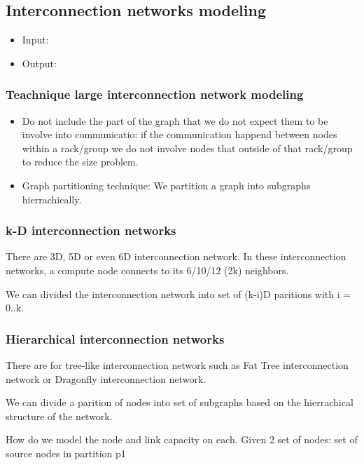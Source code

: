 \documentclass[letter]{article}
\begin{document}
\subsection {Interconnection networks  modeling}
\begin{itemize}
\item Input:
\item Output:
\end{itemize}

\subsubsection{Teachnique large interconnection network  modeling}
\begin{itemize}
\item Do not include the part of the graph that we do not expect them to be involve into communicatio: if the communication happend between nodes within a rack/group we do not involve nodes that outside of that rack/group to reduce the size problem.
\item Graph partitioning technique: We partition a graph into subgraphs hierrachically.
\end{itemize}

\subsubsection{k-D interconnection networks}
There are 3D, 5D or even 6D interconnection network. In these interconnection networks, a compute node connects to its 6/10/12 (2k) neighbors. %

We can divided the interconnection network into set of (k-i)D paritions with i = 0..k.

\subsubsection{Hierarchical interconnection networks}
There are for tree-like interconnection network such as Fat Tree interconnection network or Dragonfly interconnection network. 

We can divide a parition of nodes into set of subgraphs based on the hierrachical structure of the network.

How do we model the node and link capacity on each. Given 2 set of nodes: set of source nodes in partition p1
\end{document}
